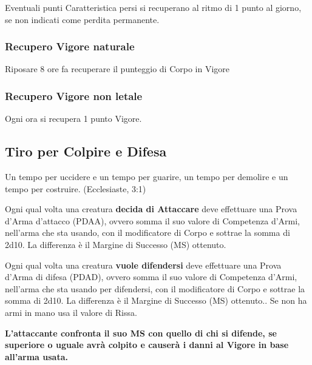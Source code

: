 \documentclass[12pt,a4paper,twoside,openany]{book}
\begin{document}
\begin{multicols}{2}
Eventuali punti Caratteristica persi si recuperano al ritmo di 1 punto al giorno, se non indicati come perdita permanente.

\subsubsection{Recupero Vigore naturale}\label{recuperopuntiferitanaturale} 

Riposare 8 ore fa recuperare il punteggio di Corpo in Vigore

\subsubsection{Recupero Vigore non letale}\label{recuperopuntiferitanonletali}\hypertarget{recuperopuntiferitanonletali}{}

Ogni ora si recupera 1 punto Vigore.

\subsection{Tiro per Colpire e Difesa}\label{tiropercolpireedifesa}

\begin{changemargin}{0.3cm}{0.3cm}\begin{enfasi}{
Un tempo per uccidere e un tempo per guarire,
un tempo per demolire e un tempo per costruire. (Ecclesiaste, 3:1)
}\end{enfasi}\end{changemargin}\medskip

Ogni qual volta una creatura \textbf{decida di Attaccare} deve effettuare una Prova d'Arma d'attacco (PDAA), ovvero somma il suo valore di Competenza d'Armi, nell'arma che sta usando, con il modificatore di Corpo e sottrae la somma di 2d10. La differenza è il Margine di Successo (MS) ottenuto.

Ogni qual volta una creatura \textbf{vuole difendersi} deve effettuare una Prova d'Arma di difesa (PDAD), ovvero somma il suo valore di Competenza d'Armi, nell'arma che sta usando per difendersi, con il modificatore di Corpo e sottrae la somma di 2d10. La differenza è il Margine di Successo (MS) ottenuto.. Se non ha armi in mano usa il valore di Rissa.

\textbf{L'attaccante confronta il suo MS con quello di chi si difende, se superiore o uguale avrà colpito e causerà i danni al Vigore in base all'arma usata.}


\end{multicols}
\end{document}
